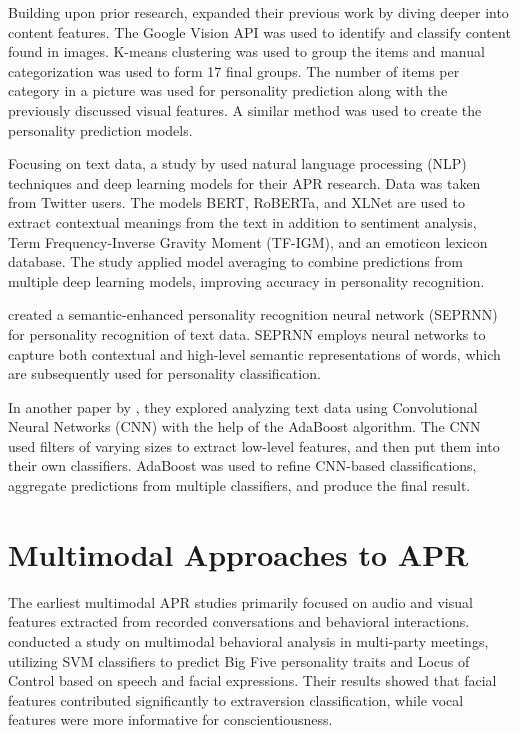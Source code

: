 Building upon prior research, \citet{Ferwerda2018} expanded their previous work by diving deeper into content features. The Google Vision API was used to identify and classify content found in images. K-means clustering was used to group the items and manual categorization was used to form 17 final groups. The number of items per category in a picture was used for personality prediction along with the previously discussed visual features. A similar method was used to create the personality prediction models. 

Focusing on text data, a study by \citet{Christian2021} used natural language processing (NLP) techniques and deep learning models for their APR research. Data was taken from Twitter users. The models BERT, RoBERTa, and XLNet are used to extract contextual meanings from the text in addition to sentiment analysis, Term Frequency-Inverse Gravity Moment (TF-IGM), and an emoticon lexicon database. The study applied model averaging to combine predictions from multiple deep learning models, improving accuracy in personality recognition.

\citet{Xue2021} created a semantic-enhanced personality recognition neural network (SEPRNN) for personality recognition of text data. SEPRNN employs neural networks to capture both contextual and high-level semantic representations of words, which are subsequently used for personality classification.

In another paper by \citet{Deilami2022}, they explored analyzing text data using Convolutional Neural Networks (CNN) with the help of the AdaBoost algorithm. The CNN used filters of varying sizes to extract low-level features, and then put them into their own classifiers. AdaBoost was used to refine CNN-based classifications, aggregate predictions from multiple classifiers, and produce the final result.

\section{Multimodal Approaches to APR}
\label{sec: MMApproaches}
The earliest multimodal APR studies primarily focused on audio and visual features extracted from recorded conversations and behavioral interactions. \citet{Pianesi2008} conducted a study on multimodal behavioral analysis in multi-party meetings, utilizing SVM classifiers to predict Big Five personality traits and Locus of Control based on speech and facial expressions. Their results showed that facial features contributed significantly to extraversion classification, while vocal features were more informative for conscientiousness.

